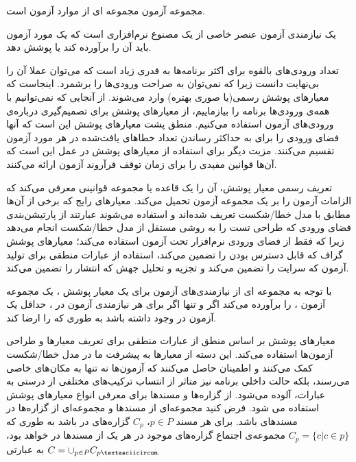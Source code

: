 مجموعه آزمون مجموعه ای از موارد آزمون است.

یک نیازمندی آزمون عنصر خاصی از یک مصنوع نرم‌افزاری است که یک مورد آزمون باید آن را برآورده کند یا پوشش دهد.

تعداد ورودی‌های بالقوه برای اکثر برنامه‌ها به قدری زیاد است که می‌توان عملا آن را بی‌نهایت دانست زیرا که نمی‌توان به صراحت ورودی‌ها را برشمرد. اینجاست که معیارهای پوشش رسمی(یا صوری بهتره) وارد می‌شوند. از آنجایی که نمی‌توانیم با همه‌ی ورودی‌ها برنامه را بیازماییم، از معیارهای پوشش برای تصمیم‌گیری درباره‌ی ورودی‌های آزمون استفاده می‌کنیم. منطق پشت معیارهای پوشش این است که آنها فضای ورودی را برای به حداکثر رساندن تعداد خطاهای یافت‌شده در هر مورد آزمون تقسیم می‌کنند. مزیت دیگر برای استفاده از معیارهای پوشش در عمل این است که آن‌ها قوانین مفیدی را برای زمان توقف فرآروند آزمون ارائه می‌کنند. 

تعریف رسمی معیار پوشش، آن را یک قاعده یا مجموعه قوانینی معرفی می‌کند که الزامات آزمون را بر یک مجموعه آزمون تحمیل می‌کند.
معیار‌های رایج‌ که برخی از آن‌ها مطابق با مدل خطا/شکست تعریف ‌شده‌اند و استفاده می‌شوند عبارتند از پارتیشن‌بندی فضای ورودی که طراحی تست را به روشی مستقل از مدل خطا/شکست انجام می‌دهد زیرا که فقط از فضای ورودی نرم‌افزار تحت آزمون استفاده می‌کند؛ معیارهای پوشش گراف که قابل دسترس بودن را تضمین می‌کند، استفاده از عبارات منطقی برای تولید آزمون که سرایت را تضمین می‌کند و تجزیه و تحلیل جهش که انتشار را تضمین می‌کند.

با توجه به مجموعه ای از نیازمندی‌های آزمون  برای یک معیار پوشش ، یک مجموعه آزمون ،  را برآورده می‌کند اگر و تنها اگر برای هر نیازمندی آزمون  در ، حداقل یک آزمون  در  وجود داشته باشد به طوری که  را ارضا کند.

معیارهای پوشش بر اساس منطق از عبارات منطقی برای تعریف معیارها و طراحی آزمون‌ها استفاده می‌کند. این دسته از معیارها به پیشرفت ما در مدل خطا/شکست کمک می‌کنند و اطمینان حاصل می‌کنند که آزمون‌ها نه تنها به مکان‌های خاصی می‌رسند، بلکه حالت داخلی برنامه نیز متاثر از انتساب ترکیب‌های مختلفی از درستی به عبارات، آلوده می‌شود.
از گزاره‌ها و مسندها برای معرفی انواع معیارهای پوشش استفاده می شود. فرض کنید  مجموعه‌ای از مسندها و  مجموعه‌ای از گزاره‌ها در مسندهای  باشد. برای هر مسند 
$p \in P$، 
$C_p$ گزاره‌های در  باشد به طوری که 
$C_p = \{c| c \in p\}$
مجموعه‌ی  اجتماع گزاره‌های موجود در هر یک از مسندها در  خواهد بود، به عبارتی 
$C = \cup_{p\in P} C_{p\textasciicircum.}$

